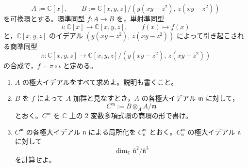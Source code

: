 \documentclass[12pt]{jlreq}
\newcommand{\C}{\mathbb{C}}
\begin{document}
\[
  A:=\C[x],\qquad
  B:=\C[x,y,z]/(y(xy-z^2),\,z(xy-z^2))
\]
を可換環とする。環準同型 \(f:A\to B\) を，単射準同型
\[
  \iota:\C[x]\longrightarrow \C[x,y,z],\qquad f(x)\longmapsto f(x)
\]
と，\(\C[x,y,z]\) のイデアル \((y(xy-z^2),\,z(xy-z^2))\) によって引き起こされる商準同型
\[
  \pi:\C[x,y,z]\longrightarrow
  \C[x,y,z]/(y(xy-z^2),\,z(xy-z^2))
\]
の合成で，\(f=\pi\circ\iota\) と定める。

\begin{enumerate}
  \item \(A\) の極大イデアルをすべて求めよ。説明も書くこと。
  \item \(B\) を \(f\) によって \(A\)-加群と見なすとき，\(A\) の各極大イデアル \(\mathfrak m\) に対して，
  \[
    C^{\mathfrak m}:=B\otimes_A A/\mathfrak m
  \]
  とおく。\(C^{\mathfrak m}\) を \(\C\) 上の \(2\) 変数多項式環の商環の形で書け。
  \item \(C^{\mathfrak m}\) の各極大イデアル \(\mathfrak n\) による局所化を \(C^{\mathfrak m}_{\mathfrak n}\) とおく。\(C^{\mathfrak m}_{\mathfrak n}\) の極大イデアル \(\overline{\mathfrak n}\) に対して
  \[
    \dim_{\C}\overline{\mathfrak n}^2/\overline{\mathfrak n}^3
  \]
  を計算せよ。
\end{enumerate}
\end{document}
